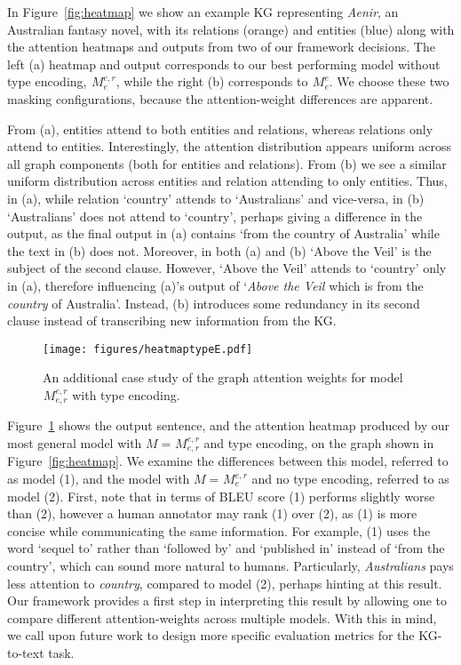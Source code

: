 \documentclass[11pt]{article}
\begin{document}
In Figure~\ref{fig:heatmap} we show an example KG representing \textit{Aenir}, an Australian fantasy novel, with its relations (orange) and entities (blue) along with the attention heatmaps and outputs from two of our framework decisions. The left (a) heatmap and output corresponds to our best performing model without type encoding, $ {}^{}_{}M^{e,r}_{e} $, while the right (b) corresponds to $ {}^{}_{}M^{e}_{e} $. We choose these two masking configurations, because the attention-weight differences are apparent.

From (a), entities attend to both entities and relations, whereas relations only attend to entities. Interestingly, the attention distribution appears uniform across all graph components (both for entities and relations). From (b) we see a similar uniform distribution across entities and relation attending to only entities. Thus, in (a), while relation `country' attends to `Australians' and vice-versa, in (b) `Australians' does not attend to `country', perhaps giving a difference in the output, as the final output in (a) contains `from the country of Australia' while the text in (b) does not. Moreover, in both (a) and (b) `Above the Veil' is the subject of the second clause. However, `Above the Veil' attends to `country' only in (a), therefore influencing (a)'s output of `\textit{Above the Veil} which is from the \textit{country} of Australia'. Instead, (b) introduces some redundancy in its second clause instead of transcribing new information from the KG.

\begin{figure}[t!]
\centering
\texttt{[image: figures/heatmaptypeE.pdf]}
\caption{An additional case study of the graph attention weights for model $ {}^{}_{}M^{e,r}_{e,r} $ with type encoding.}
\label{fig:heatmap-E}
\end{figure}





Figure~\ref{fig:heatmap-E} shows the output sentence, and the attention heatmap produced by our most general model with $ M={}^{}_{}M^{e,r}_{e,r} $ and type encoding, on the graph shown in Figure~\ref{fig:heatmap}. We examine the differences between this model, referred to as model (1), and the model with $M = {}^{}_{}M^{e,r}_{e} $ and no type encoding, referred to as model (2). First, note that in terms of BLEU score (1) performs slightly worse than (2), however a human annotator may rank (1) over (2), as (1) is more concise while communicating the same information. For example, (1) uses the word `sequel to' rather than `followed by' and `published in' instead of `from the country', which can sound more natural to humans. Particularly, \textit{Australians} pays less attention to \textit{country}, compared to model (2), perhaps hinting at this result. Our framework provides a first step in interpreting this result by allowing one to compare different attention-weights across multiple models. With this in mind, we call upon future work to design more specific evaluation metrics for the KG-to-text task.
\end{document}
